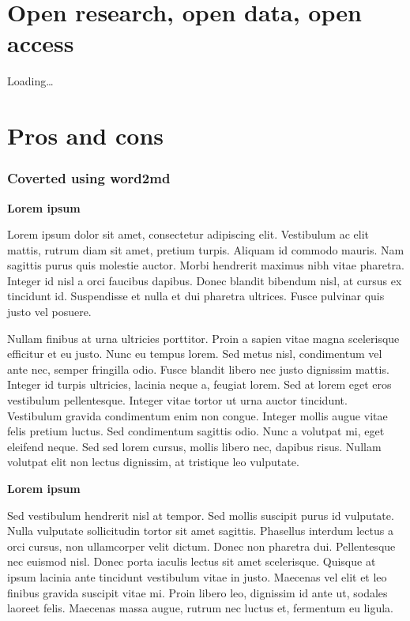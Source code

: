 \documentclass[
]{book}
\begin{document}
\hypertarget{open-research-open-data-open-access}{%
\chapter{Open research, open data, open access}\label{open-research-open-data-open-access}}

Loading\ldots{}

\hypertarget{pros-and-cons}{%
\chapter{Pros and cons}\label{pros-and-cons}}

\hypertarget{coverted-using-word2md}{%
\subsection{Coverted using word2md}\label{coverted-using-word2md}}

\textbf{Lorem ipsum}

Lorem ipsum dolor sit amet, consectetur adipiscing elit. Vestibulum ac elit mattis, rutrum diam sit amet, pretium turpis. Aliquam id commodo mauris. Nam sagittis purus quis molestie auctor. Morbi hendrerit maximus nibh vitae pharetra. Integer id nisl a orci faucibus dapibus. Donec blandit bibendum nisl, at cursus ex tincidunt id. Suspendisse et nulla et dui pharetra ultrices. Fusce pulvinar quis justo vel posuere.

Nullam finibus at urna ultricies porttitor. Proin a sapien vitae magna scelerisque efficitur et eu justo. Nunc eu tempus lorem. Sed metus nisl, condimentum vel ante nec, semper fringilla odio. Fusce blandit libero nec justo dignissim mattis. Integer id turpis ultricies, lacinia neque a, feugiat lorem. Sed at lorem eget eros vestibulum pellentesque. Integer vitae tortor ut urna auctor tincidunt. Vestibulum gravida condimentum enim non congue. Integer mollis augue vitae felis pretium luctus. Sed condimentum sagittis odio. Nunc a volutpat mi, eget eleifend neque. Sed sed lorem cursus, mollis libero nec, dapibus risus. Nullam volutpat elit non lectus dignissim, at tristique leo vulputate.

\textbf{Lorem ipsum}

Sed vestibulum hendrerit nisl at tempor. Sed mollis suscipit purus id vulputate. Nulla vulputate sollicitudin tortor sit amet sagittis. Phasellus interdum lectus a orci cursus, non ullamcorper velit dictum. Donec non pharetra dui. Pellentesque nec euismod nisl. Donec porta iaculis lectus sit amet scelerisque. Quisque at ipsum lacinia ante tincidunt vestibulum vitae in justo. Maecenas vel elit et leo finibus gravida suscipit vitae mi. Proin libero leo, dignissim id ante ut, sodales laoreet felis. Maecenas massa augue, rutrum nec luctus et, fermentum eu ligula.
\end{document}
